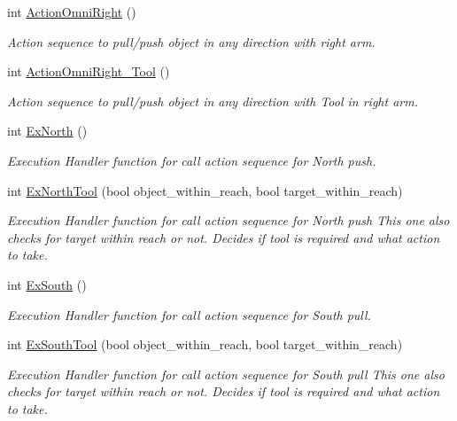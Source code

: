 \begin{DoxyCompactItemize}
int \hyperlink{structManipulate_a4fb5a32e372f7fcfb127acf9d5bb1456}{Action\+Omni\+Right} ()
\begin{DoxyCompactList}\small\item\em Action sequence to pull/push object in any direction with right arm. \end{DoxyCompactList}\item 
int \hyperlink{structManipulate_a001314f9820e91f705a9e4e9ade17533}{Action\+Omni\+Right\+\_\+\+Tool} ()
\begin{DoxyCompactList}\small\item\em Action sequence to pull/push object in any direction with Tool in right arm. \end{DoxyCompactList}\item 
int \hyperlink{structManipulate_a43cab2081e19d5502c1cfc4265a7c9fc}{Ex\+North} ()
\begin{DoxyCompactList}\small\item\em Execution Handler function for call action sequence for North push. \end{DoxyCompactList}\item 
int \hyperlink{structManipulate_afdf5f6d0d34bff3fdfa2f3a2e590ca7f}{Ex\+North\+Tool} (bool object\+\_\+within\+\_\+reach, bool target\+\_\+within\+\_\+reach)
\begin{DoxyCompactList}\small\item\em Execution Handler function for call action sequence for North push This one also checks for target within reach or not. Decides if tool is required and what action to take. \end{DoxyCompactList}\item 
int \hyperlink{structManipulate_a3cc03e07441e7993cfa52d730196ac98}{Ex\+South} ()
\begin{DoxyCompactList}\small\item\em Execution Handler function for call action sequence for South pull. \end{DoxyCompactList}\item 
int \hyperlink{structManipulate_a0fa003e72a0b1a6bccf2658ebf49d3af}{Ex\+South\+Tool} (bool object\+\_\+within\+\_\+reach, bool target\+\_\+within\+\_\+reach)
\begin{DoxyCompactList}\small\item\em Execution Handler function for call action sequence for South pull This one also checks for target within reach or not. Decides if tool is required and what action to take. \end{DoxyCompactList}\item 

\end{DoxyCompactItemize}
